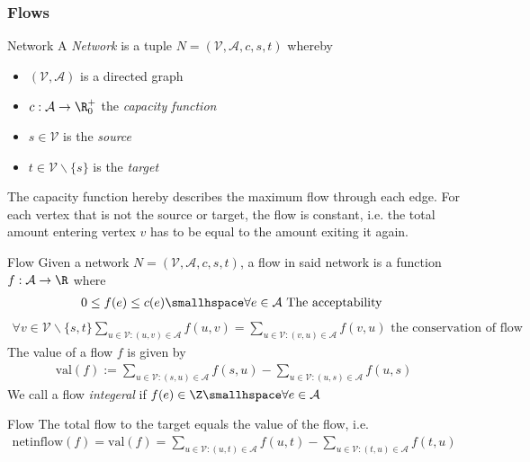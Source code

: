\newpage
\setcounter{all}{4}
\subsubsection{Flows}
\begin{definition}[]{Network}
    A \textit{Network} is a tuple $N = (\mathcal{V}, \mathcal{A}, c, s, t)$ whereby
    \begin{itemize}
        \item $(\mathcal{V}, \mathcal{A})$ is a directed graph
        \item $c: \mathcal{A} \rightarrow \R_0^+$ the \textit{capacity function}
        \item $s \in \mathcal{V}$ is the \textit{source}
        \item $t \in \mathcal{V}\backslash \{s\}$ is the \textit{target}
    \end{itemize}
\end{definition}
The capacity function hereby describes the maximum flow through each edge. For each vertex that is not the source or target, the flow is constant, i.e. the total amount entering vertex $v$ has to be equal to the amount exiting it again.

\begin{definition}[]{Flow}
    Given a network $N = (\mathcal{V}, \mathcal{A}, c, s, t)$, a flow in said network is a function $f: \mathcal{A} \rightarrow \R$ where
    \begin{align*}
        0 \leq f(e) \leq c(e) \smallhspace \forall e \in \mathcal{A} \text{ The acceptability }
    \end{align*}
    \begin{align*}
        \forall v \in \mathcal{V} \backslash \{s, t\} \sum_{u \in \mathcal{V}: (u, v) \in \mathcal{A}} f(u, v) = \sum_{u \in \mathcal{V}: (v, u) \in \mathcal{A}} f(v, u) \text{ the conservation of flow }
    \end{align*}
    The value of a flow $f$ is given by
    \begin{align*}
        \text{val}(f) := \sum_{u \in \mathcal{V}: (s, u) \in \mathcal{A}} f(s, u) - \sum_{u \in \mathcal{V}: (u, s) \in \mathcal{A}} f(u, s)
    \end{align*}
    We call a flow \textit{integeral} if $f(e) \in \Z \smallhspace \forall e \in \mathcal{A}$
\end{definition}


\begin{lemma}[]{Flow}
    The total flow to the target equals the value of the flow, i.e.
    \begin{align*}
        \text{netinflow}(f) = \text{val}(f) = \sum_{u \in \mathcal{V} : (u, t) \in \mathcal{A}} f(u, t) - \sum_{u \in \mathcal{V}: (t, u) \in \mathcal{A}} f(t, u)
    \end{align*}
\end{lemma}
